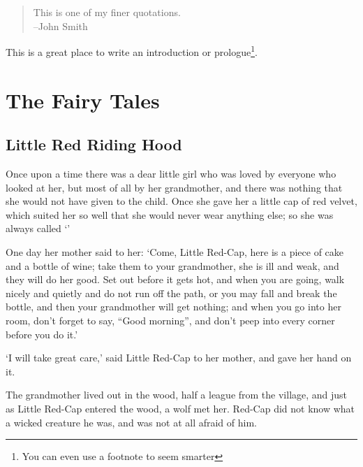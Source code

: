 \documentclass[oneside,11pt]{book} %
\begin{document}
\begin{quote}
This is one of my finer quotations.\\
--John Smith
\end{quote}

This is a great place to write an introduction or prologue\footnote{You can even use a footnote to seem smarter}.


\part{The Fairy Tales}


\chapter{Little Red Riding Hood}

Once upon a time there was a dear little girl who was loved by everyone who looked at her, but most of all by her grandmother, and there was nothing that she would not have given to the child. Once she gave her a little cap of red velvet, which suited her so well that she would never wear anything else; so she was always called `'

One day her mother said to her: `Come, Little Red-Cap, here is a piece of cake and a bottle of wine; take them to your grandmother, she is ill and weak, and they will do her good. Set out before it gets hot, and when you are going, walk nicely and quietly and do not run off the path, or you may fall and break the bottle, and then your grandmother will get nothing; and when you go into her room, don't forget to say, ``Good morning'', and don't peep into every corner before you do it.'

`I will take great care,' said Little Red-Cap to her mother, and gave her hand on it.

The grandmother lived out in the wood, half a league from the village, and just as Little Red-Cap entered the wood, a wolf met her. Red-Cap did not know what a wicked creature he was, and was not at all afraid of him.
\end{document}
